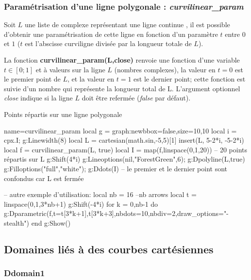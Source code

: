 \subsubsection{Paramétrisation d'une ligne polygonale : \emph{curvilinear\_param}}
Soit $L$ une liste de complexe représentant une ligne \og continue \fg, il est possible d'obtenir une paramétrisation de cette ligne en fonction d'un paramètre $t$ entre $0$ et $1$ ($t$ est l'abscisse curviligne divisée par la longueur totale de $L$).

La fonction \textbf{curvilinear\_param(L,close)} renvoie une fonction d'une variable $t\in[0;1]$ et à valeurs sur la ligne  $L$ (nombres complexes), la valeur en $t=0$ est le premier point de $L$, et la valeur en $t=1$ est le dernier point; cette fonction est suivie d'un nombre qui représente la longueur total de L. L'argument optionnel \emph{close} indique si la ligne $L$  doit être refermée (\emph{false} par défaut).

\begin{demo}{Points répartis sur une ligne polygonale}
\begin{luadraw}{name=curvilinear_param}
local g = graph:new{bbox=false,size={10,10}}
local i = cpx.I; g:Linewidth(8)
local L = cartesian(math.sin,-5,5)[1]
insert(L, {5-2*i, -5-2*i})
local f = curvilinear_param(L, true)
local I = map(f,linspace(0,1,20)) -- 20 points répartis sur L
g:Shift(4*i)
g:Lineoptions(nil,"ForestGreen",6); g:Dpolyline(L,true)
g:Filloptions("full","white"); g:Ddots(I) -- le premier et le dernier point sont confondus car L est fermée

-- autre exemple d'utilisation:
local nb = 16 --nb arrows
local t = linspace(0,1,3*nb+1)
g:Shift(-4*i)
for k = 0,nb-1 do
    g:Dparametric(f,{t={t[3*k+1],t[3*k+3]},nbdots=10,nbdiv=2,draw_options="-stealth"})
end
g:Show() 
\end{luadraw}
\end{demo}


\subsection{Domaines liés à des courbes cartésiennes}

\subsubsection{Ddomain1}


